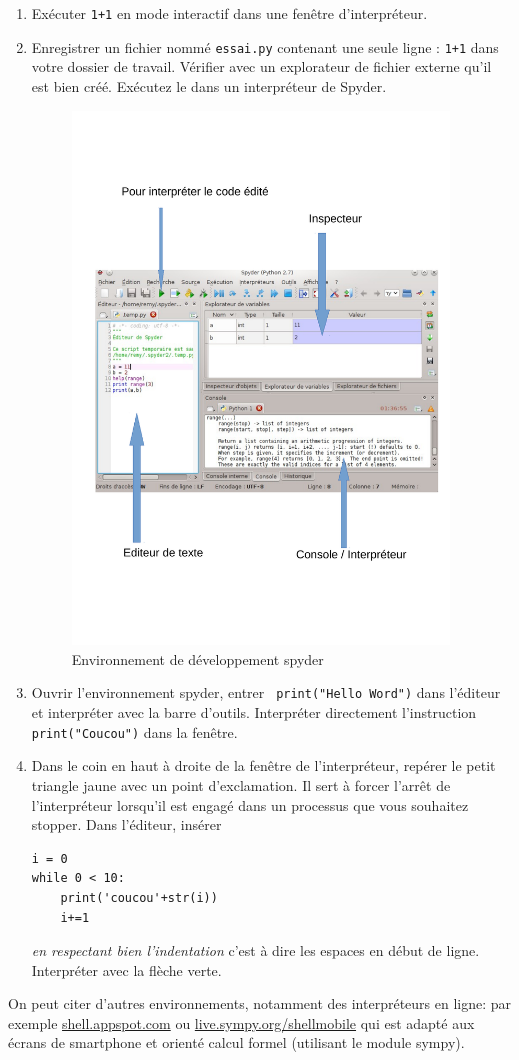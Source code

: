 \begin{enumerate}
 \item Exécuter \verb|1+1| en mode interactif dans une fenêtre d'interpréteur.
 \item Enregistrer un fichier nommé \verb|essai.py| contenant une seule ligne : \verb|1+1| dans votre dossier de travail. Vérifier avec un explorateur de fichier externe qu'il est bien créé. Exécutez le dans un interpréteur de Spyder. 
 
 \begin{figure}[h!]
 \centering
 \includegraphics[width=10cm,keepaspectratio=true]{./spyder.pdf}
 \caption{Environnement de développement spyder}
 \label{fig:spyder}
\end{figure}
 \item Ouvrir l'environnement spyder, entrer \verb| print("Hello Word")| dans l'éditeur et interpréter avec la barre d'outils.\newline
 Interpréter directement l'instruction \verb|print("Coucou")| dans la fenêtre.
 \item Dans le coin en haut à droite de la fenêtre de l'interpréteur, repérer le petit triangle jaune avec un point d'exclamation. Il sert à forcer l'arrêt de l'interpréteur lorsqu'il est engagé dans un processus que vous souhaitez stopper. Dans l'éditeur, insérer
 \begin{verbatim}
i = 0
while 0 < 10:
    print('coucou'+str(i))
    i+=1
 \end{verbatim}
\emph{en respectant bien l'indentation} c'est à dire les espaces en début de ligne. Interpréter avec la flèche verte.
\end{enumerate}
On peut citer d'autres environnements, notamment des interpréteurs en ligne: par exemple \href{http://shell.appspot.com}{shell.appspot.com} ou \href{http://live.sympy.org/shellmobile}{live.sympy.org/shellmobile} qui est adapté aux écrans de smartphone et orienté calcul formel  (utilisant le module sympy). 